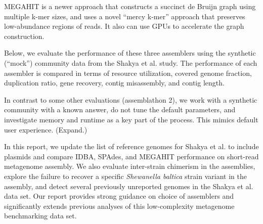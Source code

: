 \documentclass[10pt,a4paper,twocolumn]{article}
\begin{document}
MEGAHIT \cite{megahit} is a newer approach that constructs a succinct
de Bruijn graph using multiple k-mer sizes, and uses a novel ``mercy
k-mer'' approach that preserves low-abundance regions of reads. It also
can use GPUs to accelerate the graph construction.

Below, we evaluate the performance of these three assemblers using the
synthetic (``mock'') community data from the Shakya et al. study.
The performance of each assembler is compared in terms
of resource utilization, covered genome fraction, duplication ratio, gene
recovery, contig misassembly, and contig length.

In contrast to some other evaluations (assemblathon 2), we work with a
synthetic community with a known answer, do not tune the default
parameters, and investigate memory and runtime as a key part of the
process.  This mimics default user experience. (Expand.)

In this report, we update the list of reference genomes for Shakya et
al.  to include plasmids and compare IDBA, SPAdes, and MEGAHIT
performance on short-read metagenome assembly.  We also evaluate
inter-strain chimerism in the assemblies, explore the failure to
recover a specific {\em Shewanella baltica} strain variant in the
assembly, and detect several previously unreported genomes in the
Shakya et al. data set.  Our report provides strong guidance on choice
of assemblers and significantly extends previous analyses of this
low-complexity metagenome benchmarking data set.





 
\end{document}
